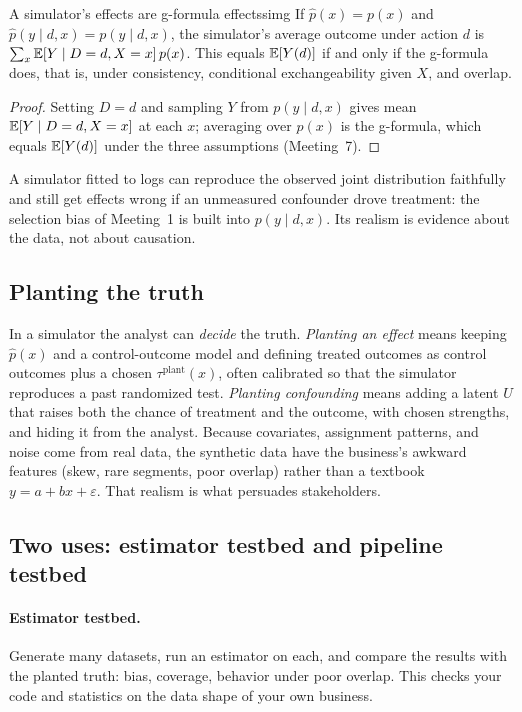 \documentclass[11pt]{article}
\begin{document}
\begin{prop}{A simulator's effects are g-formula effects}{simg}
If $\hat p(x) = p(x)$ and $\hat p(y \mid d, x) = p(y \mid d, x)$, the simulator's average outcome under action $d$ is
$\sum_x \mathbb{E}[Y \mid D=d, X=x]\,p(x)$. This equals $\mathbb{E}[Y(d)]$ if and only if the g-formula does, that is, under consistency, conditional
exchangeability given $X$, and overlap.
\end{prop}
\begin{proof}
Setting $D = d$ and sampling $Y$ from $p(y \mid d, x)$ gives mean $\mathbb{E}[Y \mid D=d, X=x]$ at each $x$; averaging over $p(x)$ is the g-formula,
which equals $\mathbb{E}[Y(d)]$ under the three assumptions (Meeting~7).
\end{proof}

A simulator fitted to logs can reproduce the observed joint distribution faithfully and still get effects wrong if an unmeasured
confounder drove treatment: the selection bias of Meeting~1 is built into $p(y \mid d, x)$. Its realism is evidence about the data,
not about causation.

\subsection{Planting the truth}

In a simulator the analyst can \emph{decide} the truth. \emph{Planting an effect} means keeping $\hat p(x)$ and a control-outcome
model and defining treated outcomes as control outcomes plus a chosen $\tau^{\text{plant}}(x)$, often calibrated so that the
simulator reproduces a past randomized test. \emph{Planting confounding} means adding a latent $U$ that raises both the chance of
treatment and the outcome, with chosen strengths, and hiding it from the analyst. Because covariates, assignment patterns, and noise come from real data, the synthetic data
have the business's awkward features (skew, rare segments, poor overlap) rather than a textbook $y = a + bx + \varepsilon$. That realism is
what persuades stakeholders.

\subsection{Two uses: estimator testbed and pipeline testbed}

\paragraph{Estimator testbed.} Generate many datasets, run an estimator on each, and compare the results with the planted truth:
bias, coverage, behavior under poor overlap. This checks your code and statistics on the data shape of your own business.
\end{document}
